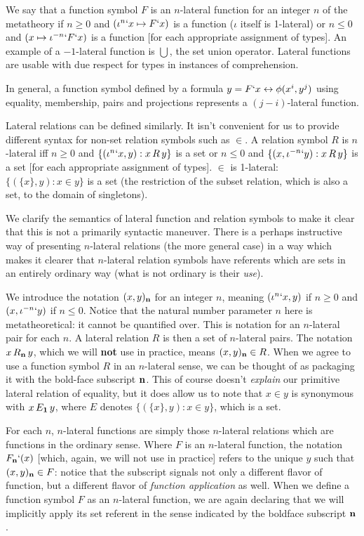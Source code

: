 \documentclass[12pt]{article}
\begin{document}
We say that a function symbol $F$ is an $n$-lateral function for an integer $n$ of the metatheory  if $n\geq 0$ and $(\iota^n`x \mapsto F`x)$ is a function ($\iota$ itself is 1-lateral)
or $n\leq 0$ and $(x \mapsto \iota^{-n}`F`x)$ is a function [for each appropriate assignment of types]. An example of a $-1$-lateral function is $\bigcup$, the set union operator.   Lateral functions are usable with due respect for types in instances of comprehension.

In general, a function symbol defined by a formula $y = F`x \leftrightarrow \phi(x^i,y^j)$ using equality, membership, pairs and projections represents a $(j-i)$-lateral function.

Lateral relations can be defined similarly.  It isn't convenient for us to provide different syntax for non-set relation symbols such as $\in$.  A relation symbol
$R$ is $n$-lateral iff $n \geq 0$ and $\{(\iota^n`x,y):x \, R\, y\}$ is a set or $n \leq 0$ and $\{(x,\iota^{-n}`y):x \, R\, y\}$ is a set [for each appropriate assignment of types].  $\in$ is 1-lateral:  $\{(\{x\},y):x \in y\}$ is a set (the restriction of the subset relation, which is also a set, to the domain of singletons).

We clarify the semantics of lateral function and relation symbols to make it clear that this is not a primarily syntactic maneuver.  There is a perhaps instructive way of presenting $n$-lateral relations (the more general case) in a way which makes it clearer that $n$-lateral relation symbols have referents which are sets in an entirely ordinary way (what is not ordinary is their {\em use\/}).

We introduce the notation $(x,y)_{\bf n}$ for an integer $n$, meaning $(\iota^n`x,y)$ if $n\geq0$ and $(x,\iota^{-n}`y)$ if $n\leq 0$.  Notice that the natural number parameter $n$ here is metatheoretical:  it cannot be quantified over.  This is notation for an $n$-lateral pair for each $n$.  A lateral relation $R$ is then a set of $n$-lateral pairs.  The notation $x \, R_{\bf n} \, y$, which we will {\bf not} use in practice, means $(x,y)_{\bf n} \in R$.  When we agree to use a function symbol $R$ in an $n$-lateral sense, we can be thought of as packaging it with the bold-face subscript ${\bf n}$.  This of course doesn't {\em explain\/} our primitive lateral relation of equality, but it does allow us to note that $x \in y$ is synonymous with $x \, E_{\bf 1} \, y$, where
$E$ denotes $\{(\{x\},y):x \in y\}$, which is a set.  

For each $n$, $n$-lateral functions are simply those $n$-lateral relations which are functions in the ordinary sense.  Where $F$ is an $n$-lateral function, the notation
$F_{\bf n}`(x)$ [which, again, we will not use in practice] refers to the unique $y$ such that $(x,y)_{\bf n}\in F$:  notice that the subscript  signals not only  a different flavor of function, but a different flavor of {\em function application\/} as well.   When we define a function symbol $F$ as an $n$-lateral function, we are again declaring that we will implicitly apply its set referent  in the sense
indicated by the boldface subscript ${\bf n}$.
\end{document}
